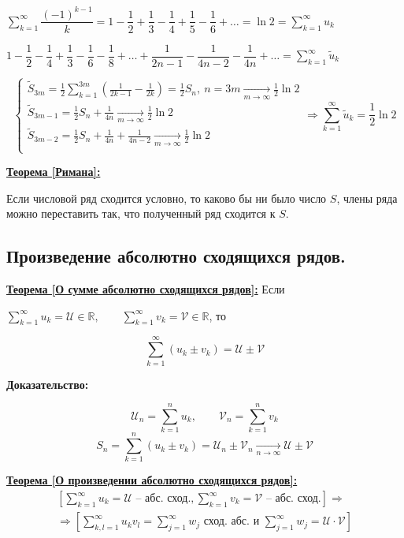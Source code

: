 \documentclass[a4paper,12pt]{article} %
\newcommand{\R}{\mathbb{R}}
\newcommand{\series}{\sum\limits_{k=1}^{\infty}}
\newcommand{\useries}{\sum\limits_{k=1}^{\infty} u_k}
\newcommand{\sn}{\sum\limits_{k=1}^{n} u_k}
\begin{document}
$\series \dfrac{(-1)^{k-1}}{k} = 1 - \dfrac{1}{2} + \dfrac{1}{3} - \dfrac{1}{4} + \dfrac{1}{5} - \dfrac{1}{6} + \ldots = \ln 2 = \useries$

$1 - \dfrac{1}{2} - \dfrac{1}{4} + \dfrac{1}{3} - \dfrac{1}{6} - \dfrac{1}{8} + \ldots + \dfrac{1}{2n-1} - \dfrac{1}{4n-2} - \dfrac{1}{4n} + \ldots = \sum\limits_{k=1}^{\infty} \tilde{u}_k$

\begin{equation*}
	\begin{cases}
		\tilde{S}_{3m} = \frac{1}{2} \sum\limits_{k=1}^{3m}\left( \frac{1}{2k-1} - \frac{1}{2k} \right) = \frac{1}{2} S_{n}, \ n=3m \xrightarrow[m \to \infty]{} \frac{1}{2} \ln 2\\
		\tilde{S}_{3m - 1} = \frac{1}{2} S_n + \frac{1}{4n} \xrightarrow[m \to \infty]{} \frac{1}{2} \ln 2 \\
		\tilde{S}_{3m - 2} = \frac{1}{2} S_n + \frac{1}{4n} + \frac{1}{4n-2} \xrightarrow[m \to \infty]{} \frac{1}{2} \ln 2 \\
	\end{cases}
	\Rightarrow \sum\limits_{k=1}^{\infty} \tilde{u}_k = \dfrac{1}{2} \ln 2
\end{equation*}

\underline{\textbf{Теорема [Римана]:}}

Если числовой ряд сходится условно, то каково бы ни было число $S$, члены ряда можно переставить так, что полученный ряд сходится к $S$.

\subsection{Произведение абсолютно сходящихся рядов.}

\underline{\textbf{Теорема [О сумме абсолютно сходящихся рядов]:}} Если

$\useries = \mathscr{U} \in \R, \hspace{2em} \series v_k = \mathscr{V} \in \R$, то

\[ \series (u_k \pm v_k) = \mathscr{U} \pm \mathscr{V} \]

\textbf{Доказательство:}

\[ \mathscr{U}_n = \sn, \hspace{2em} \mathscr{V}_n = \sum\limits_{k=1}^{n}v_k \]
\[ S_n = \sum\limits_{k=1}^{n}(u_k \pm v_k) = \mathscr{U}_n \pm \mathscr{V}_n \xrightarrow[n \to \infty]{} \mathscr{U} \pm \mathscr{V} \]

\underline{\textbf{Теорема [О произведении абсолютно сходящихся рядов]:}}
\begin{multline*}
	\left[ \useries = \mathscr{U} \text{ -- абс. сход.}, \sum\limits_{k=1}^{\infty}v_k = \mathscr{V} \text{ -- абс. сход.} \right] \Rightarrow \\ \Rightarrow \left[ \sum\limits_{k, l =1}^{\infty}u_k v_l = \sum\limits_{j=1}^{\infty} w_j \text{ сход. абс. и } \sum\limits_{j=1}^{\infty} w_j = \mathscr{U} \cdot \mathscr{V} \right]
\end{multline*}
\end{document}
